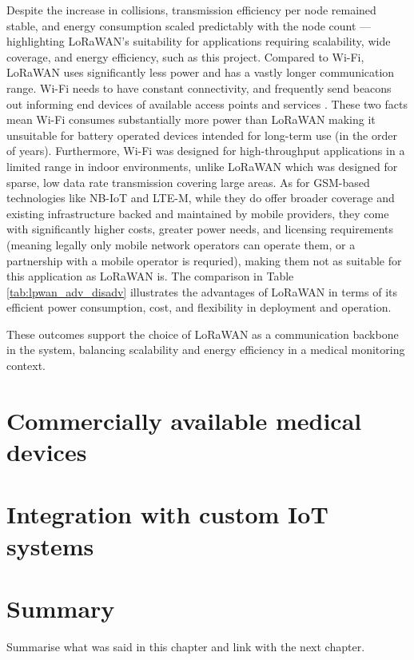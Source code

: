 Despite the increase in collisions, transmission efficiency per node remained stable, and energy consumption scaled predictably with the node count --- highlighting LoRaWAN's suitability for applications requiring scalability, wide coverage, and energy efficiency, such as this project. Compared to Wi-Fi, LoRaWAN uses significantly less power and has a vastly longer communication range. Wi-Fi needs to have constant connectivity, and frequently send beacons out informing end devices of available access points and services \cite{wifi_beacons}. These two facts mean Wi-Fi consumes substantially more power than LoRaWAN making it unsuitable for battery operated devices intended for long-term use (in the order of years). Furthermore, Wi-Fi was designed for high-throughput applications in a limited range in indoor environments, unlike LoRaWAN which was designed for sparse, low data rate transmission covering large areas. As for GSM-based technologies like NB-IoT and LTE-M, while they do offer broader coverage and existing infrastructure backed and maintained by mobile providers, they come with significantly higher costs, greater power needs, and licensing requirements (meaning legally only mobile network operators can operate them, or a partnership with a mobile operator is requried), making them not as suitable for this application as LoRaWAN is. The comparison in Table \ref{tab:lpwan_adv_disadv} illustrates the advantages of LoRaWAN in terms of its efficient power consumption, cost, and flexibility in deployment and operation.

These outcomes support the choice of LoRaWAN as a communication backbone in the system, balancing scalability and energy efficiency in a medical monitoring context.

\section{Commercially available medical devices} %

\section{Integration with custom IoT systems} %

\section{Summary} %
Summarise what was said in this chapter and link with the next chapter.
